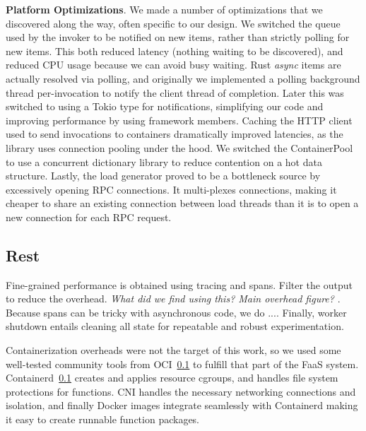 \textbf{Platform Optimizations}.
We made a number of optimizations that we discovered along the way, often specific to our design.
We switched the queue used by the invoker to be notified on new items, rather than strictly polling for new items.
This both reduced latency (nothing waiting to be discovered), and reduced CPU usage because we can avoid busy waiting.
Rust \emph{async} items are actually resolved via polling, and originally we implemented a polling background thread per-invocation to notify the client thread of completion.
Later this was switched to using a Tokio type for notifications, simplifying our code and improving performance by using framework members.
Caching the HTTP client used to send invocations to containers dramatically improved latencies, as the library uses connection pooling under the hood.
We switched the ContainerPool to use a concurrent dictionary library to reduce contention on a hot data structure.
Lastly, the load generator proved to be a bottleneck source by excessively opening RPC connections.
It multi-plexes connections, making it cheaper to share an existing connection between load threads than it is to open a new connection for each RPC request.



\subsection{Rest} 



Fine-grained performance is obtained using tracing and spans. Filter the output to reduce the overhead. \emph{What did we find using this? Main overhead figure?} . Because spans can be tricky with asynchronous code, we do ....
Finally, worker shutdown entails cleaning all state for repeatable and robust experimentation. 


Containerization overheads were not the target of this work, so we used some well-tested community tools from OCI~\ref{} to fulfill that part of the FaaS system.
Containerd~\ref{} creates and applies resource cgroups, and handles file system protections for functions.
CNI handles the necessary networking connections and isolation, and finally Docker images integrate seamlessly with Containerd making it easy to create runnable function packages.

